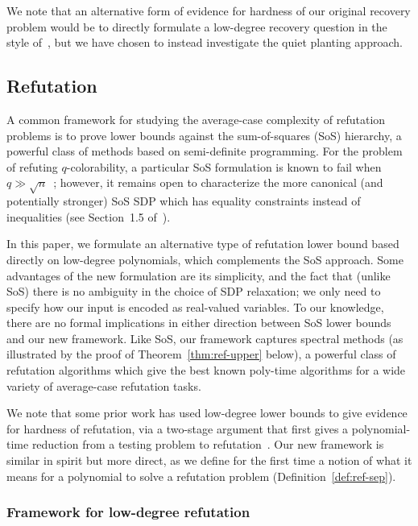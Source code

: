 \documentclass{article}
\begin{document}
We note that an alternative form of evidence for hardness of our original recovery problem would be to directly formulate a low-degree recovery question in the style of~\cite{SW-recovery}, but we have chosen to instead investigate the quiet planting approach.



\subsection{Refutation}

A common framework for studying the average-case complexity of refutation problems is to prove lower bounds against the sum-of-squares (SoS) hierarchy, a powerful class of methods based on semi-definite programming. For the problem of refuting $q$-colorability, a particular SoS formulation is known to fail when $q \gg \sqrt{n}$~\cite{KM21}; however, it remains open to characterize the more canonical (and potentially stronger) SoS SDP which has equality constraints instead of inequalities (see Section~1.5 of~\cite{KM21}).

In this paper, we formulate an alternative type of refutation lower bound based directly on low-degree polynomials, which complements the SoS approach. Some advantages of the new formulation are its simplicity, and the fact that (unlike SoS) there is no ambiguity in the choice of SDP relaxation; we only need to specify how our input is encoded as real-valued variables. To our knowledge, there are no formal implications in either direction between SoS lower bounds and our new framework. Like SoS, our framework captures spectral methods (as illustrated by the proof of Theorem~\ref{thm:ref-upper} below), a powerful class of refutation algorithms which give the best known poly-time algorithms for a wide variety of average-case refutation tasks.

We note that some prior work has used low-degree lower bounds to give evidence for hardness of refutation, via a two-stage argument that first gives a polynomial-time reduction from a testing problem to refutation~\cite{sk-cert,nonneg-pca}. Our new framework is similar in spirit but more direct, as we define for the first time a notion of what it means for a polynomial to solve a refutation problem (Definition~\ref{def:ref-sep}).



\subsubsection{Framework for low-degree refutation}
\end{document}
